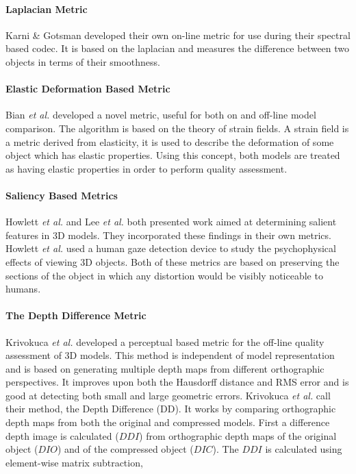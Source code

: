 \paragraph{Laplacian Metric}

Karni \& Gotsman \cite{Karni00Spectral} developed their own on-line metric for use during their spectral based codec. It is based on the laplacian and measures the difference between two objects in terms of their smoothness. 

\paragraph{Elastic Deformation Based Metric}

Bian \textit{et al.} \cite{Bian09Evaluation} developed a novel metric, useful for both on and off-line model comparison. The algorithm is based on the theory of strain fields. A strain field is a metric derived from elasticity, it is used to describe the deformation of some object which has elastic properties. Using this concept, both models are treated as having elastic properties in order to perform quality assessment.

\paragraph{Saliency Based Metrics}

Howlett \textit{et al.} \cite{Howlett04Experimental} and Lee \textit{et al.} \cite{Lee05Mesh} both presented work aimed at determining salient features in 3D models. They incorporated these findings in their own metrics. Howlett \textit{et al.} used a human gaze detection device to study the psychophysical effects of viewing 3D objects. Both of these metrics are based on preserving the sections of the object in which any distortion would be visibly noticeable to humans.

\paragraph{The Depth Difference Metric}

Krivokuca \textit{et al.} \cite{Krivokuca12New} developed a perceptual based metric for the off-line quality assessment of 3D models. This method is independent of model representation and is based on generating multiple depth maps from different orthographic perspectives. It improves upon both the Hausdorff distance and RMS error and is good at detecting both small and large geometric errors. Krivokuca \textit{et al.} call their method, the Depth Difference (DD). It works by comparing orthographic depth maps from both the original and compressed models. First a difference depth image is calculated ($DDI$) from orthographic depth maps of the original object ($DIO$) and of the compressed object ($DIC$). The $DDI$ is calculated using element-wise matrix subtraction,

